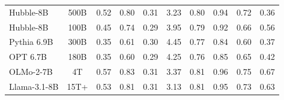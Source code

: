 \begin{table}[h]
\begin{tabular}{lccccccccc}
{Hubble-8B} & %
  {500B} &
  {0.52} &
  {0.80} &
  {0.31} &
  {3.23} &
  {0.80} &
  {0.94} &
  {0.72} &
  {0.36} \\
{Hubble-8B} & %
  {100B} &
  {0.45} &
  {0.74} &
  {0.29} &
  {3.95} &
  {0.79} &
  {0.92} &
  {0.66} &
  {0.56} \\
{Pythia 6.9B} &
  {300B} &
  {0.35} &
  {0.61} &
  {0.30} &
  {4.45} &
  {0.77} &
  {0.84} &
  {0.60} &
  {0.37} \\
{OPT 6.7B} &
  {180B} &
  {0.35} &
  {0.60} &
  {0.29} &
  {4.25} &
  {0.76} &
  {0.85} &
  {0.65} &
  {0.42} \\
{OLMo-2-7B} &
  {4T} &
  {0.57} &
  {0.83} &
  {0.31} &
  {3.37} &
  {0.81} &
  {0.96} &
  {0.75} &
  {0.67} \\
{Llama-3.1-8B} &
  {15T+} &
  {0.53} &
  {0.81} &
  {0.31} &
  {3.13} &
  {0.81} &
  {0.95} &
  {0.73} &
  {0.63} \\
\bottomrule
\end{tabular}
\end{table}